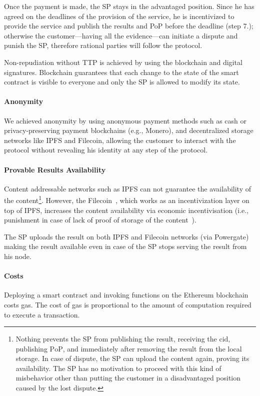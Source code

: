 Once the payment is made, the SP stays in the advantaged position. Since he has agreed on the deadlines of the provision of the service, he is incentivized
to provide the service and publish the results and PoP before the deadline (step 7.); otherwise the customer—having all the evidence—can initiate a dispute and punish the SP, therefore rational parties will follow the protocol.

Non-repudiation without TTP is achieved by using the blockchain and digital signatures. Blockchain guarantees that each change to the state of the smart contract is visible to everyone and only the SP is allowed to modify its state. 

\paragraph{Anonymity}
We achieved anonymity by using anonymous payment methods such as cash or privacy-preserving payment blockchains (e.g., Monero), and decentralized storage networks like IPFS and Filecoin, allowing the customer to interact with the protocol without revealing his identity at any step of the protocol.

\paragraph{Provable Results Availability}
Content addressable networks such as IPFS can not guarantee the availability of the content\footnote{Nothing prevents the SP from publishing the result, receiving the $\mathrm{cid}$, publishing $\mathrm{PoP}$, and immediately after removing the result from the local storage. In case of dispute, the SP can upload the content again, proving its availability. The SP has no motivation to proceed with this kind of misbehavior other than putting the customer in a disadvantaged position caused by the lost dispute.}. However, the Filecoin~\cite{protocollabsFilecoinDecentralizedStorage2017}, which works as an incentivization layer on top of IPFS, increases the content availability via economic incentivisation (i.e., punishment in case of lack of proof of storage of the content~\cite{filecoinSlashing}).

The SP uploads the result on both IPFS and Filecoin networks (via Powergate) making the result available even in case of the SP stops serving the result from his node.

\paragraph{Costs}
Deploying a smart contract and invoking functions on the Ethereum blockchain costs gas. The cost of gas is proportional to the amount of computation required to execute a transaction. 

